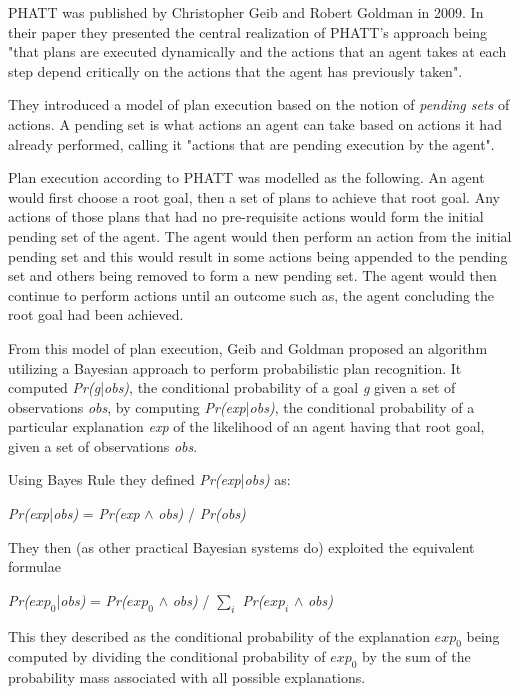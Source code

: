 \documentclass[parskip]{cs4rep}
\begin{document}
PHATT was published by Christopher Geib and Robert Goldman in 2009. In their paper they presented the central realization of PHATT's approach being "that plans are executed dynamically and the actions that an agent takes at each step depend critically on the actions that the agent has previously taken". 

They introduced a model of plan execution based on the notion of \textit{pending sets} of actions. A pending set is what actions an agent can take based on actions it had already performed, calling it "actions that are pending execution by the agent".

Plan execution according to PHATT was modelled as the following. An agent would first choose a root goal, then a set of plans to achieve that root goal. Any actions of those plans that had no pre-requisite actions would form the initial pending set of the agent. The agent would then perform an action from the initial pending set and this would result in some actions being appended to the pending set and others being removed to form a new pending set. The agent would then continue to perform actions until an outcome such as, the agent concluding the root goal had been achieved.

From this model of plan execution, Geib and Goldman proposed an algorithm utilizing a Bayesian approach to perform probabilistic plan recognition. It computed \textit{Pr(g}|\textit{obs)}, the conditional probability of a goal \textit{g} given a set of observations \textit{obs}, by computing \textit{Pr(exp}|\textit{obs)}, the conditional probability of a particular explanation \textit{exp} of the likelihood of an agent having that root goal, given a set of observations \textit{obs}.

Using Bayes Rule they defined \textit{Pr(exp}|\textit{obs)} as:\newline

\centerline{
\textit{Pr(exp}|\textit{obs)} = \textit{Pr(exp} $\wedge$ \textit{obs)} / \textit{Pr(obs)}
}

They then (as other practical Bayesian systems do) exploited the equivalent formulae\newline

\centerline{
\textit{Pr($exp_0$}|\textit{obs)} = \textit{Pr($exp_0$} $\wedge$ \textit{obs)} / $\displaystyle\sum\nolimits_{i}$ \textit{Pr($exp_i$} $\wedge$ \textit{obs)}
}

This they described as the conditional probability of the explanation $exp_0$ being computed by dividing the conditional probability of $exp_0$  by the sum of the probability mass associated with all possible explanations.
\end{document}
